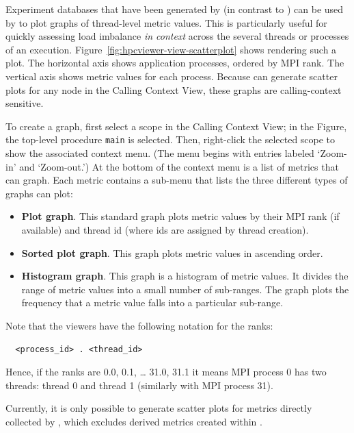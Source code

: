 \HPCToolkit{} Experiment databases that have been generated by \hpcprofmpi{} (in contrast to \hpcprof{}) can be used by \hpcviewer{} to plot graphs of thread-level metric values.
This is particularly useful for quickly assessing load imbalance \emph{in context} across the several threads or processes of an execution.
Figure~\ref{fig:hpcviewer-view-scatterplot} shows \hpcviewer{} rendering such a plot.
The horizontal axis shows application processes, ordered by MPI rank.
The vertical axis shows metric values for each process.
Because \hpcviewer{} can generate scatter plots for any node in the Calling Context View, these graphs are calling-context sensitive.

To create a graph, first select a scope in the Calling Context View; in the Figure, the top-level procedure \texttt{main} is selected.
Then, right-click the selected scope to show the associated context menu.
(The menu begins with entries labeled `Zoom-in' and `Zoom-out.')
At the bottom of the context menu is a list of metrics that \hpcviewer{} can graph.
Each metric contains a sub-menu that lists the three different types of graphs \hpcviewer{} can plot:
\begin{itemize}
\item \textbf{Plot graph}.
  This standard graph plots metric values by their MPI rank (if available) and thread id (where ids are assigned by thread creation).

\item \textbf{Sorted plot graph}.
  This graph plots metric values in ascending order.

\item \textbf{Histogram graph}.
  This graph is a histogram of metric values.
  It divides the range of metric values into a small number of sub-ranges.
  The graph plots the frequency that a metric value falls into a particular sub-range.
\end{itemize}

Note that the viewers have the following notation for the ranks:
\begin{verbatim}
  <process_id> . <thread_id>
\end{verbatim}
Hence, if the ranks are 0.0, 0.1, \dots{} 31.0, 31.1 it means MPI process 0 has two threads: thread 0 and thread 1 (similarly with MPI process 31). 


Currently, it is only possible to generate scatter plots for metrics directly collected by \hpcrun{}, which excludes derived metrics created within \hpcviewer{}.


